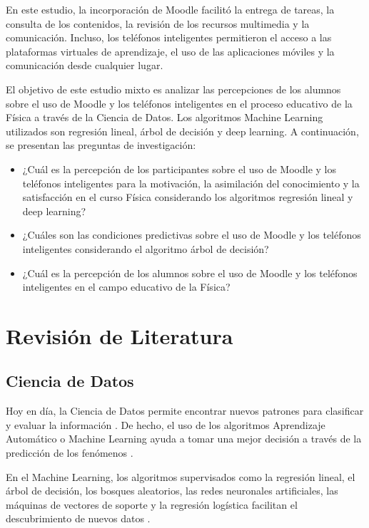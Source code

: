 \documentclass[spanish]{textolivre}
\begin{document}
En este estudio, la incorporación de Moodle facilitó la entrega de tareas, la consulta de los contenidos, la revisión de los recursos multimedia y la comunicación. Incluso, los teléfonos inteligentes permitieron el acceso a las plataformas virtuales de aprendizaje, el uso de las aplicaciones móviles y la comunicación desde cualquier lugar.

El objetivo de este estudio mixto es analizar las percepciones de los alumnos sobre el uso de Moodle y los teléfonos inteligentes en el proceso educativo de la Física a través de la Ciencia de Datos. Los algoritmos Machine Learning utilizados son regresión lineal, árbol de decisión y deep learning. A continuación, se presentan las preguntas de investigación:

\begin{itemize}
  \item ¿Cuál es la percepción de los participantes sobre el uso de Moodle y los teléfonos inteligentes para la motivación, la asimilación del conocimiento y la satisfacción en el curso Física considerando los algoritmos regresión lineal y deep learning?
  \item ¿Cuáles son las condiciones predictivas sobre el uso de Moodle y los teléfonos inteligentes considerando el algoritmo árbol de decisión?
  \item ¿Cuál es la percepción de los alumnos sobre el uso de Moodle y los teléfonos inteligentes en el campo educativo de la Física?
\end{itemize}


\section{Revisión de Literatura}

\subsection{Ciencia de Datos}

Hoy en día, la Ciencia de Datos permite encontrar nuevos patrones para clasificar y evaluar la información \cite{chadaga_battling_2021, khanal_systematic_2020}. De hecho, el uso de los algoritmos Aprendizaje Automático o Machine Learning ayuda a tomar una mejor decisión a través de la predicción de los fenómenos \cite{chadaga_battling_2021, khanal_systematic_2020, koyuncu_classification_2022}.

En el Machine Learning, los algoritmos supervisados como la regresión lineal, el árbol de decisión, los bosques aleatorios, las redes neuronales artificiales, las máquinas de vectores de soporte y la regresión logística facilitan el descubrimiento de nuevos datos \cite{chadaga_battling_2021}.
\end{document}

